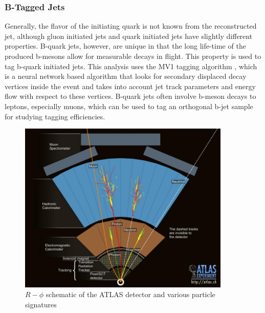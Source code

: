 \subsubsection{B-Tagged Jets}
Generally, the flavor of the initiating quark is not known from the reconstructed jet, although gluon initiated jets and quark initiated jets have slightly different properties. B-quark jets, however, are unique in that the long life-time of the produced b-mesons allow for measurable decays in flight. This property is used to tag b-quark initiated jets. This analysis uses the MV1 tagging algorithm \cite{ATLAS-CONF-2011-102}, which is a neural network based algorithm that looks for secondary displaced decay vertices inside the event and takes into account jet track parameters and energy flow with respect to these vertices. B-quark jets often involve b-meson decays to leptons, especially muons, which can be used to tag an orthogonal b-jet sample for studying tagging efficiencies.

\begin{figure}
\centering 
\includegraphics[width=0.9\textwidth]{figs/lhc/particles.jpeg}
\caption{$R-\phi$ schematic of the ATLAS detector and various particle signatures}
\label{figure:lhc_particles}
\end{figure}

